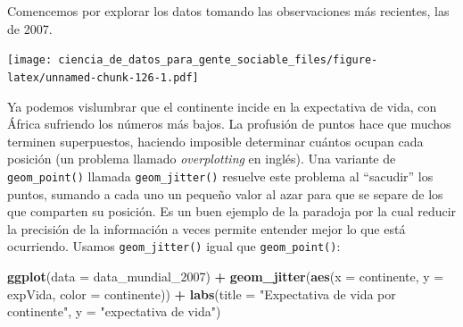 \documentclass[]{book}
\newenvironment{Shaded}{\begin{snugshade}}{\end{snugshade}}
\newcommand{\KeywordTok}[1]{\textcolor[rgb]{0.13,0.29,0.53}{\textbf{#1}}}
\newcommand{\DataTypeTok}[1]{\textcolor[rgb]{0.13,0.29,0.53}{#1}}
\newcommand{\DecValTok}[1]{\textcolor[rgb]{0.00,0.00,0.81}{#1}}
\newcommand{\StringTok}[1]{\textcolor[rgb]{0.31,0.60,0.02}{#1}}
\newcommand{\OperatorTok}[1]{\textcolor[rgb]{0.81,0.36,0.00}{\textbf{#1}}}
\newcommand{\NormalTok}[1]{#1}
\begin{document}
Comencemos por explorar los datos tomando las observaciones más
recientes, las de 2007.

\begin{Shaded}
\end{Shaded}

\texttt{[image: ciencia\_de\_datos\_para\_gente\_sociable\_files/figure-latex/unnamed-chunk-126-1.pdf]}

Ya podemos vislumbrar que el continente incide en la expectativa de
vida, con África sufriendo los números más bajos. La profusión de puntos
hace que muchos terminen superpuestos, haciendo imposible determinar
cuántos ocupan cada posición (un problema llamado \emph{overplotting} en
inglés). Una variante de \texttt{geom\_point()} llamada
\texttt{geom\_jitter()} resuelve este problema al ``sacudir'' los
puntos, sumando a cada uno un pequeño valor al azar para que se separe
de los que comparten su posición. Es un buen ejemplo de la paradoja por
la cual reducir la precisión de la información a veces permite entender
mejor lo que está ocurriendo. Usamos \texttt{geom\_jitter()} igual que
\texttt{geom\_point()}:

\begin{Shaded}
\begin{Highlighting}[]
\KeywordTok{ggplot}\NormalTok{(}\DataTypeTok{data =}\NormalTok{ data_mundial_}\DecValTok{2007}\NormalTok{) }\OperatorTok{+}
\StringTok{    }\KeywordTok{geom_jitter}\NormalTok{(}\KeywordTok{aes}\NormalTok{(}\DataTypeTok{x =}\NormalTok{ continente, }\DataTypeTok{y =}\NormalTok{ expVida, }\DataTypeTok{color =}\NormalTok{ continente)) }\OperatorTok{+}
\StringTok{    }\KeywordTok{labs}\NormalTok{(}\DataTypeTok{title =} \StringTok{"Expectativa de vida por continente"}\NormalTok{,}
         \DataTypeTok{y =} \StringTok{"expectativa de vida"}\NormalTok{)}
\end{Highlighting}
\end{Shaded}
\end{document}

